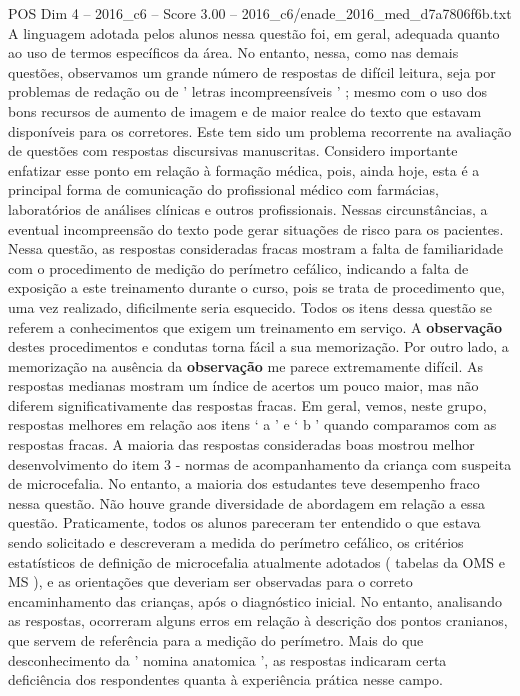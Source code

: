 \begin{textsample}{POS Dim 4 – 2016\_c6 – Score 3.00 – 2016\_c6/enade\_2016\_med\_d7a7806f6b.txt}
A linguagem adotada pelos alunos nessa questão foi, em geral, adequada quanto ao uso de termos específicos da área.
No entanto, nessa, como nas demais questões, observamos um grande número de respostas de difícil leitura, seja por problemas de redação ou de ' letras incompreensíveis ' ; mesmo com o uso dos bons recursos de aumento de imagem e de maior realce do texto que estavam disponíveis para os corretores.
Este tem sido um problema recorrente na avaliação de questões com respostas discursivas manuscritas.
Considero importante enfatizar esse ponto em relação à formação médica, pois, ainda hoje, esta é a principal forma de comunicação do profissional médico com farmácias, laboratórios de análises clínicas e outros profissionais.
Nessas circunstâncias, a eventual incompreensão do texto pode gerar situações de risco para os pacientes.
Nessa questão, as respostas consideradas fracas mostram a falta de familiaridade com o procedimento de medição do perímetro cefálico, indicando a falta de exposição a este treinamento durante o curso, pois se trata de procedimento que, uma vez realizado, dificilmente seria esquecido.
Todos os itens dessa questão se referem a conhecimentos que exigem um treinamento em serviço.
A \textbf{observação} destes procedimentos e condutas torna fácil a sua memorização.
Por outro lado, a memorização na ausência da \textbf{observação} me parece extremamente difícil.
As respostas medianas mostram um índice de acertos um pouco maior, mas não diferem significativamente das respostas fracas.
Em geral, vemos, neste grupo, respostas melhores em relação aos itens ‘ a ’ e ‘ b ’ quando comparamos com as respostas fracas.
A maioria das respostas consideradas boas mostrou melhor desenvolvimento do item 3 - normas de acompanhamento da criança com suspeita de microcefalia.
No entanto, a maioria dos estudantes teve desempenho fraco nessa questão.
Não houve grande diversidade de abordagem em relação a essa questão.
Praticamente, todos os alunos pareceram ter entendido o que estava sendo solicitado e descreveram a medida do perímetro cefálico, os critérios estatísticos de definição de microcefalia atualmente adotados ( tabelas da OMS e MS ), e as orientações que deveriam ser observadas para o correto encaminhamento das crianças, após o diagnóstico inicial.
No entanto, analisando as respostas, ocorreram alguns erros em relação à descrição dos pontos cranianos, que servem de referência para a medição do perímetro.
Mais do que desconhecimento da ' nomina anatomica ', as respostas indicaram certa deficiência dos respondentes quanta à experiência prática nesse campo.

\end{textsample}
